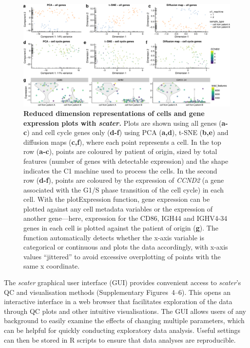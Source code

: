 \documentclass{bioinfo}
\begin{document}
\begin{figure}[!htpb]%
\centerline{\includegraphics[width=\textwidth]{figure4.eps}}
\caption{\textbf{Reduced dimension representations of cells and gene expression plots with \emph{scater.}} Plots are shown using all genes (\textbf{a-c}) and cell cycle genes only (\textbf{d-f}) using PCA (\textbf{a,d}), t-SNE (\textbf{b,e}) and diffusion maps (\textbf{c,f}), where each point represents a cell. In the top row (\textbf{a-c}), points are coloured by patient of origin, sized by total features (number of genes with detectable expression) and the shape indicates the C1 machine used to process the cells. In the second row (\textbf{d-f}), points are coloured by the expression of \emph{CCND2} (a gene associated with the G1/S phase transition of the cell cycle) in each cell. With the plotExpression function, gene expression can be plotted against any cell metadata variables or the expression of another gene---here, expression for the CD86, IGH44 and IGHV4-34 genes in each cell is plotted against the patient of origin (\textbf{g}). The function automatically detects whether the x-axis variable is categorical or continuous and plots the data accordingly, with x-axis values ``jittered'' to avoid excessive overplotting of points with the same x coordinate.}\label{fig:04}
\end{figure}


The \emph{scater} graphical user interface (GUI) provides convenient
access to \emph{scater}'s QC and visualisation methods (Supplementary
Figures~4--6). This opens an interactive interface in a web browser that facilitates exploration of the data through QC plots and other intuitive visualisations. The GUI allows users of any background to easily examine the effects of changing multiple parameters, which can be helpful for quickly conducting exploratory data analysis. Useful settings can then be stored in R scripts to ensure that data analyses are reproducible.
\end{document}

